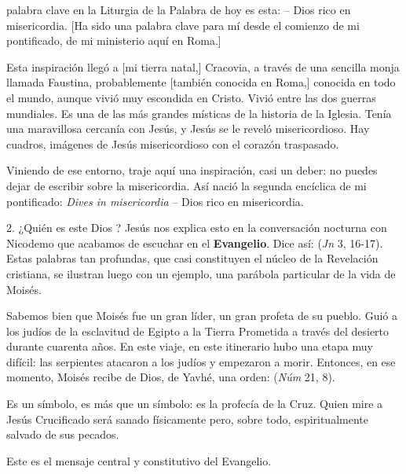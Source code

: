 \begin{body}
 palabra clave en la Liturgia de la Palabra de hoy es esta:  – Dios rico en misericordia. [Ha sido una palabra clave para mí desde el comienzo de mi pontificado, de mi ministerio aquí en Roma.]

Esta inspiración llegó a [mi tierra natal,] Cracovia, a través de una sencilla monja llamada Faustina, probablemente [también conocida en Roma,] conocida en todo el mundo, aunque vivió muy escondida en Cristo. Vivió entre las dos guerras mundiales. Es una de las más grandes místicas de la historia de la Iglesia. Tenía una maravillosa cercanía con Jesús, y Jesús se le reveló misericordioso. Hay cuadros, imágenes de Jesús misericordioso con el corazón traspasado.

Viniendo de ese entorno, traje aquí una inspiración, casi un deber: no puedes dejar de escribir sobre la misericordia. Así nació la segunda encíclica de mi pontificado: \textit{Dives in misericordia} – Dios rico en misericordia.

2. ¿Quién es este Dios ? Jesús nos explica esto en la conversación nocturna con Nicodemo que acabamos de escuchar en el \textbf{Evangelio}. Dice así:  (\textit{Jn} 3, 16-17). Estas palabras tan profundas, que casi constituyen el núcleo de la Revelación cristiana, se ilustran luego con un ejemplo, una parábola particular de la vida de Moisés.

Sabemos bien que Moisés fue un gran líder, un gran profeta de su pueblo. Guió a los judíos de la esclavitud de Egipto a la Tierra Prometida a través del desierto durante cuarenta años. En este viaje, en este itinerario hubo una etapa muy difícil: las serpientes atacaron a los judíos y empezaron a morir. Entonces, en ese momento, Moisés recibe de Dios, de Yavhé, una orden:  (\textit{Núm} 21, 8).

Es un símbolo, es más que un símbolo: es la profecía de la Cruz. Quien mire a Jesús Crucificado será sanado físicamente pero, sobre todo, espiritualmente salvado de sus pecados.

Este es el mensaje central y constitutivo del Evangelio.


\end{body}
